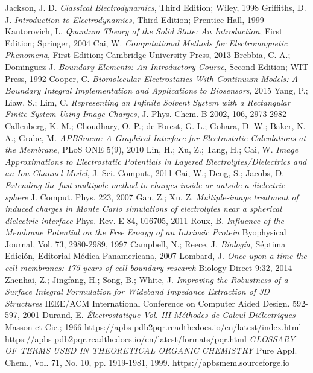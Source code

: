 \documentclass[12pt, oneside, numbers, spanish]{ezthesis}
\numberwithin{equation}{section}
\begin{document}
\begin{thebibliography}{150}
Jackson, J. D. \textit{Classical Electrodynamics}, Third Edition; Wiley, 1998
Griffiths, D. J. \textit{Introduction to Electrodynamics}, Third Edition; Prentice Hall, 1999
Kantorovich, L. \textit{Quantum Theory of the Solid State: An Introduction}, First Edition; Springer, 2004
Cai, W. \textit{Computational Methods for Electromagnetic Phenomena}, First Edition; Cambridge University Press, 2013
Brebbia, C. A.; Dominguez J. \textit{Boundary Elements: An Introductory Course}, Second Edition; WIT Press, 1992
Cooper, C. \textit{Biomolecular Electrostatics With Continuum Models: A Boundary Integral Implementation and Applications to Biosensors}, 2015
Yang, P.; Liaw, S.; Lim, C. \textit{Representing an Infinite Solvent System with a Rectangular Finite System Using Image Charges}, J. Phys. Chem. B 2002, 106, 2973-2982
Callenberg, K. M.; Choudhary, O. P.; de Forest, G. L.; Gohara, D. W.; Baker, N. A.; Grabe, M. \textit{APBSmem: A Graphical Interface for Electrostatic Calculations at the Membrane}, PLoS ONE 5(9), 2010
Lin, H.; Xu, Z.; Tang, H.; Cai, W. \textit{Image Approximations to Electrostatic Potentials in Layered Electrolytes/Dielectrics and an Ion-Channel Model}, J. Sci. Comput., 2011
Cai, W.; Deng, S.; Jacobs, D. \textit{Extending the fast multipole method to charges inside or outside a dielectric sphere} J. Comput. Phys. 223, 2007
Gan, Z.; Xu, Z. \textit{Multiple-image treatment of induced charges in Monte Carlo simulations of electrolytes near a spherical dielectric interface} Phys. Rev. E 84, 016705, 2011
Roux, B. \textit{Influence of the Membrane Potential on the Free Energy of an Intrinsic Protein} Byophysical Journal, Vol. 73, 2980-2989, 1997
Campbell, N.; Reece, J. \textit{Biología}, Séptima Edición, Editorial Médica Panamericana, 2007
Lombard, J. \textit{Once upon a time the cell membranes: 175 years of cell boundary research} Biology Direct 9:32, 2014
Zhenhai, Z.; Jingfang, H.; Song, B.; White, J. \textit{Improving the Robustness of a Surface Integral Formulation for Wideband Impedance Extraction of 3D Structures} IEEE/ACM International Conference on Computer Aided Design. 592-597, 2001 
Durand, E. \textit{Électrostatique Vol. III Méthodes de Calcul Diélectriques} Masson et Cie.; 1966
https://apbs-pdb2pqr.readthedocs.io/en/latest/index.html
https://apbs-pdb2pqr.readthedocs.io/en/latest/formats/pqr.html
\textit{GLOSSARY OF TERMS USED IN THEORETICAL ORGANIC CHEMISTRY} Pure Appl. Chem., Vol. 71, No. 10, pp. 1919-1981, 1999.
https://apbsmem.sourceforge.io
\end{thebibliography}
\end{document}
